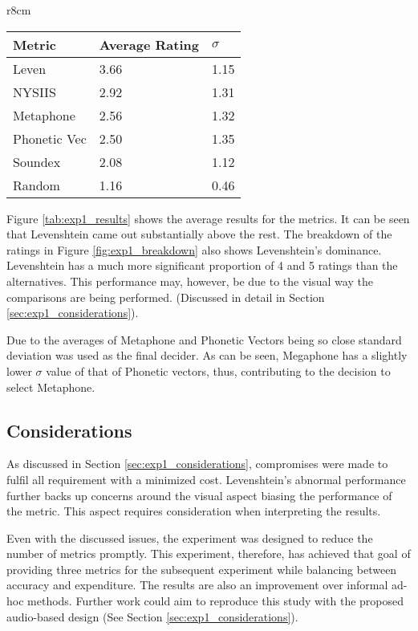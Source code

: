 \begin{wraptable}[11]{r}{8cm}
    \centering
    \begin{tabular}{|l|l|l|}
        \hline
        \textbf{Metric} & \textbf{Average Rating}  & \textbf{$\sigma$}\\
        \hline
        Leven     & 3.66  & 1.15\\
        NYSIIS    & 2.92 & 1.31\\
        Metaphone & 2.56 & 1.32\\
        Phonetic Vec & 2.50 & 1.35\\
        Soundex & 2.08 & 1.12 \\
        \hline
        Random  & 1.16 & 0.46\\
        \hline
    \end{tabular}
    \caption{Average metric performance}
    \label{tab:exp1_results}
\end{wraptable}


Figure \ref{tab:exp1_results} shows the average results for the metrics. It can be seen that Levenshtein came out substantially above the rest. The breakdown of the ratings in Figure \ref{fig:exp1_breakdown} also shows Levenshtein's dominance. Levenshtein has a much more significant proportion of 4 and 5 ratings than the alternatives. This performance may, however, be due to the visual way the comparisons are being performed. (Discussed in detail in Section \ref{sec:exp1_considerations}). 

Due to the averages of Metaphone and Phonetic Vectors being so close standard deviation was used as the final decider. As can be seen, Megaphone has a slightly lower $\sigma$ value of that of Phonetic vectors, thus, contributing to the decision to select Metaphone.

\subsection*{Considerations}
As discussed in Section \ref{sec:exp1_considerations}, compromises were made to fulfil all requirement with a minimized cost. Levenshtein's abnormal performance further backs up concerns around the visual aspect biasing the performance of the metric. This aspect requires consideration when interpreting the results. 

Even with the discussed issues, the experiment was designed to reduce the number of metrics promptly. This experiment, therefore, has achieved that goal of providing three metrics for the subsequent experiment while balancing between accuracy and expenditure. The results are also an improvement over informal ad-hoc methods. Further work could aim to reproduce this study with the proposed audio-based design (See Section \ref{sec:exp1_considerations}).

